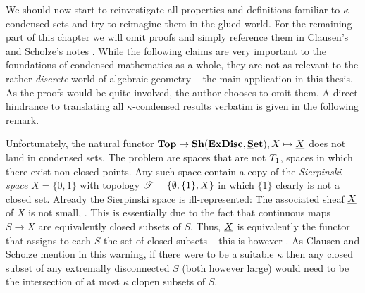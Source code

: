 We should now start to reinvestigate all properties and definitions familiar to $\kappa$-condensed sets and try to reimagine them in the glued world. For the remaining part of this chapter we will omit proofs and simply reference them in Clausen's and Scholze's notes \cite{condenseddotpdf}. While the following claims are very important to the foundations of condensed mathematics as a whole, they are not as relevant to the rather \emph{discrete} world of algebraic geometry -- the main application in this thesis. As the proofs would be quite involved, the author chooses to omit them. A direct hindrance to translating all $\kappa$-condensed results verbatim is given in the following remark. 
\begin{remark}
	Unfortunately, the natural functor $\Top \to \Sheaves{\extremallyDisconnectedSets}{\Set}, X\mapsto \associated{X}$ does not land in condensed sets. The problem are spaces that are not ${T_1}$, \ie spaces in which there exist non-closed points. Any such space contain a copy of the \emph{Sierpinski-space} $X=\{0, 1\}$ with topology ${\mathscr{T}} = \{\emptyset, \{1\}, X\}$ in which $\{1\}$ clearly is not a closed set. Already the Sierpinski space is ill-represented: The associated sheaf $\underline{X}$ of $X$ is not small, \confer \cite[Warning 2.14]{condenseddotpdf}. This is essentially due to the fact that continuous maps $S\to X$ are equivalently closed subsets of $S$. Thus, $\underline{X}$ is equivalently the functor that assigns to each $S$ the set of closed subsets -- this is however . As Clausen and Scholze mention in this warning, if there were to be a suitable $\kappa$ then any closed subset of any extremally disconnected $S$ (both however large) would need to be the intersection of at most $\kappa$ clopen subsets of $S$.
\end{remark}

